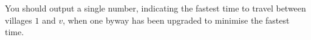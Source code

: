 You should output a single number, indicating the fastest time to travel
between villages $1$ and $v$, when one byway has been upgraded to minimise the
fastest time.

